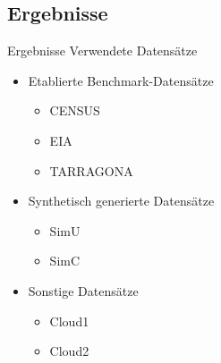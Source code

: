 \documentclass[10pt,table]{beamer}
\begin{document}
\subsection{Ergebnisse}
\begin{frame}{Ergebnisse}
Verwendete Datensätze
\begin{itemize}
    \item Etablierte Benchmark-Datensätze
    \begin{itemize}
        \item CENSUS
        \item EIA
        \item TARRAGONA
    \end{itemize}
    \item Synthetisch generierte Datensätze
    \begin{itemize}
        \item SimU
        \item SimC
    \end{itemize}
    \item Sonstige Datensätze
    \begin{itemize}
        \item Cloud1
        \item Cloud2
    \end{itemize}
\end{itemize}
\end{frame}

\end{document}
